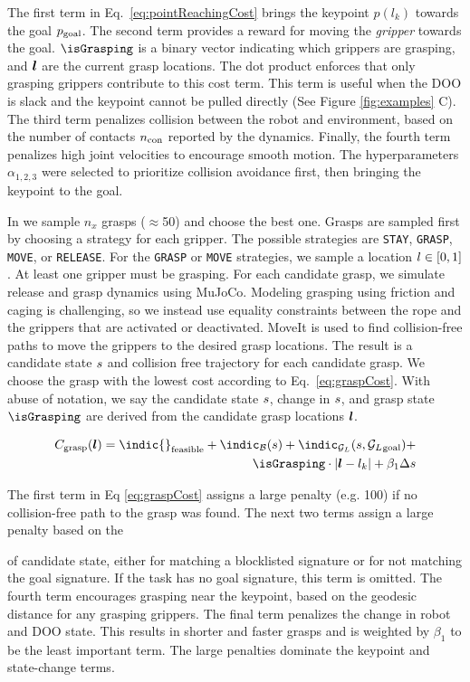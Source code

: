 The first term in Eq.~\ref{eq:pointReachingCost} brings the keypoint $p(l_k)$ towards the goal $p_\text{goal}$. The second term provides a reward for moving the \textit{gripper} towards the goal. $\isGrasping$ is a binary vector indicating which grippers are grasping, and $\bm{l}$ are the current grasp locations. The dot product enforces that only grasping grippers contribute to this cost term. This term is useful when the DOO is slack and the keypoint cannot be pulled directly (See Figure \ref{fig:examples} C). The third term penalizes collision between the robot and environment, based on the number of contacts $n_\text{con}$ reported by the dynamics. Finally, the fourth term penalizes high joint velocities to encourage smooth motion. The hyperparameters $\alpha_{1,2,3}$ were selected to prioritize collision avoidance first, then bringing the keypoint to the goal.

In \planGrasp{} we sample $n_x$ grasps ($\approx$50) and choose the best one. Grasps are sampled first by choosing a strategy for each gripper. The possible strategies are \texttt{STAY}, \texttt{GRASP}, \texttt{MOVE}, or \texttt{RELEASE}. For the \texttt{GRASP} or \texttt{MOVE} strategies, we sample a location $l \in [0,1]$. At least one gripper must be grasping. For each candidate grasp, we simulate release and grasp dynamics using MuJoCo. Modeling grasping using friction and caging is challenging, so we instead use equality constraints between the rope and the grippers that are activated or deactivated. MoveIt \cite{MoveIt} is used to find collision-free paths to move the grippers to the desired grasp locations. The result is a candidate state $s$ and collision free trajectory for each candidate grasp. We choose the grasp with the lowest cost according to Eq.~\ref{eq:graspCost}. With abuse of notation, we say the candidate state $s$, change in $s$, and grasp state $\isGrasping$ are derived from the candidate grasp locations $\bm{l}$.
            
\begin{equation}
    \label{eq:graspCost}
    \begin{split}
    \graspCost(\locs)= \indic{}_\text{feasible} + \indic_{\blist}(\state) + \indic_{\sig}(\state, \goalSig) + \\
    \isGrasping \cdot |\locs - \kp | + \beta_1 \Delta \state
   \end{split}
\end{equation}

The first term in Eq \ref{eq:graspCost} assigns a large penalty (e.g. 100) if no collision-free path to the grasp was found. The next two terms assign a large penalty based on the \signature{} of candidate state, either for matching a blocklisted signature or for not matching the goal signature. If the task has no goal signature, this term is omitted. The fourth term encourages grasping near the keypoint, based on the geodesic distance for any grasping grippers. The final term penalizes the change in robot and DOO state. This results in shorter and faster grasps and is weighted by $\beta_1$ to be the least important term. The large penalties dominate the keypoint and state-change terms.

